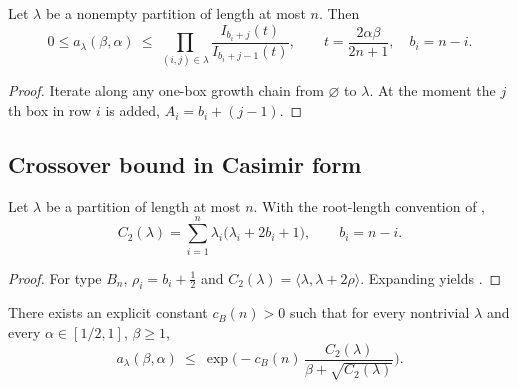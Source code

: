 \begin{corollary}
\label{cor:SOodd_telescoping}
Let $\lambda$ be a nonempty partition of length at most $n$.
Then
\begin{equation}
\label{eq:SOodd_product_over_boxes}
0\le a_{\lambda}(\beta,\alpha)
\ \le\ \prod_{(i,j)\in\lambda}\frac{I_{b_i+j}(t)}{I_{b_i+j-1}(t)},
\qquad t=\frac{2\alpha\beta}{2n+1},\quad b_i=n-i.
\end{equation}
\end{corollary}

\begin{proof}
Iterate  along any one-box growth chain from $\varnothing$ to $\lambda$.
At the moment the $j$th box in row $i$ is added, $A_i=b_i+(j-1)$.
\end{proof}

\subsection{Crossover bound in Casimir form}
\label{subsec:A1_Spin_odd_crossover}

\begin{lemma}
\label{lem:SOodd_casimir}
Let $\lambda$ be a partition of length at most $n$.
With the root-length convention of ,
\begin{equation}
\label{eq:SOodd_casimir_formula}
C_2(\lambda)=\sum_{i=1}^n \lambda_i\big(\lambda_i+2b_i+1\big),\qquad b_i=n-i.
\end{equation}
\end{lemma}

\begin{proof}
For type $B_n$, $\rho_i=b_i+\tfrac12$ and $C_2(\lambda)=\langle\lambda,\lambda+2\rho\rangle$.
Expanding yields .
\end{proof}

\begin{proposition}
\label{prop:SOodd_A1_final}
There exists an explicit constant $c_{B}(n)>0$ such that for every nontrivial $\lambda$ and every $\alpha\in[1/2,1]$, $\beta\ge 1$,
\begin{equation}
\label{eq:SOodd_A1_final}
 a_{\lambda}(\beta,\alpha)
\ \le\
\exp\Big(-c_{B}(n)\,\frac{C_2(\lambda)}{\beta+\sqrt{C_2(\lambda)}}\Big).
\end{equation}
\end{proposition}

